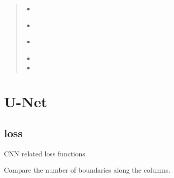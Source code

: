 \documentclass[letterpaper,10pt,english]{sphinxmanual}
\begin{document}
\begin{fulllineitems}
\begin{quote}
\begin{description}
\begin{itemize}
\begin{itemize}
\item {} 

\item {} 
{\hyperref[\detokenize{index:util.load_data.load_train_data}]{}}

\item {} 
{\hyperref[\detokenize{index:util.load_batch.load_batch_parallel}]{}}

\item {} 

\item {} 

\end{itemize}


\end{itemize}

\end{description}\end{quote}

\end{fulllineitems}



\chapter{U-Net}
\label{\detokenize{index:u-net}}

\section{loss}
\label{\detokenize{index:module-unet.loss}}\label{\detokenize{index:loss}}
CNN related loss functions

\begin{fulllineitems}
\label{\detokenize{index:unet.loss.boundary_transition_loss}}
Compare the number of boundaries along the columns.

\end{fulllineitems}
\end{document}
